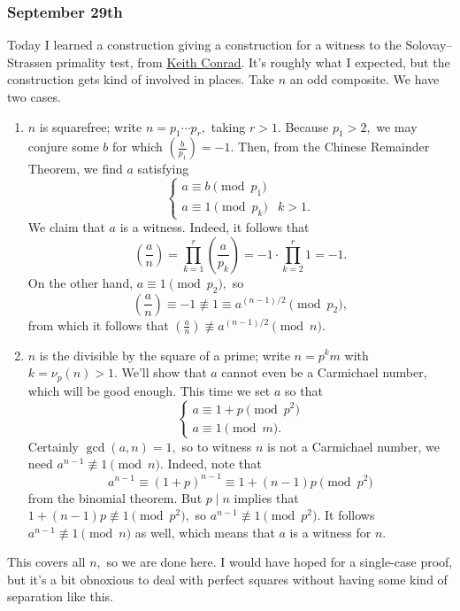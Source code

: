 \subsubsection{September 29th}
Today I learned a construction giving a construction for a witness to the Solovay--Strassen primality test, from \href{https://kconrad.math.uconn.edu/blurbs/ugradnumthy/solovaystrassen.pdf}{Keith Conrad}. It's roughly what I expected, but the construction gets kind of involved in places. Take $n$ an odd composite. We have two cases.
\begin{enumerate}[label=(\alph*)]
    \item $n$ is squarefree; write $n=p_1\cdots p_r,$ taking $r>1.$ Because $p_1>2,$ we may conjure some $b$ for which $\left(\frac b{p_1}\right)=-1.$ Then, from the Chinese Remainder Theorem, we find $a$ satisfying
    \[\begin{cases}
        a\equiv b\pmod{p_1} \\
        a\equiv1\pmod{p_k} & k>1.
    \end{cases}\]
    We claim that $a$ is a witness. Indeed, it follows that
    \[\left(\frac an\right)=\prod_{k=1}^r\left(\frac a{p_k}\right)=-1\cdot\prod_{k=2}^r1=-1.\]
    On the other hand, $a\equiv1\pmod{p_2},$ so
    \[\left(\frac an\right)\equiv-1\not\equiv1\equiv a^{(n-1)/2}\pmod{p_2},\]
    from which it follows that $\left(\frac an\right)\not\equiv a^{(n-1)/2}\pmod n.$
    
    \item $n$ is the divisible by the square of a prime; write $n=p^km$ with $k=\nu_p(n)>1.$ We'll show that $a$ cannot even be a Carmichael number, which will be good enough. This time we set $a$ so that
    \[\begin{cases}
        a \equiv 1+p\pmod{p^2} \\ 
        a \equiv 1\pmod m.
    \end{cases}\]
    Certainly $\gcd(a,n)=1,$ so to witness $n$ is not a Carmichael number, we need $a^{n-1}\not\equiv1\pmod n.$ Indeed, note that
    \[a^{n-1}\equiv(1+p)^{n-1}\equiv 1+(n-1)p\pmod{p^2}\]
    from the binomial theorem. But $p\mid n$ implies that $1+(n-1)p\not\equiv1\pmod{p^2},$ so $a^{n-1}\not\equiv1\pmod{p^2}.$ It follows $a^{n-1}\not\equiv1\pmod n$ as well, which means that $a$ is a witness for $n.$
\end{enumerate}
This covers all $n,$ so we are done here. I would have hoped for a single-case proof, but it's a bit obnoxious to deal with perfect squares without having some kind of separation like this.

